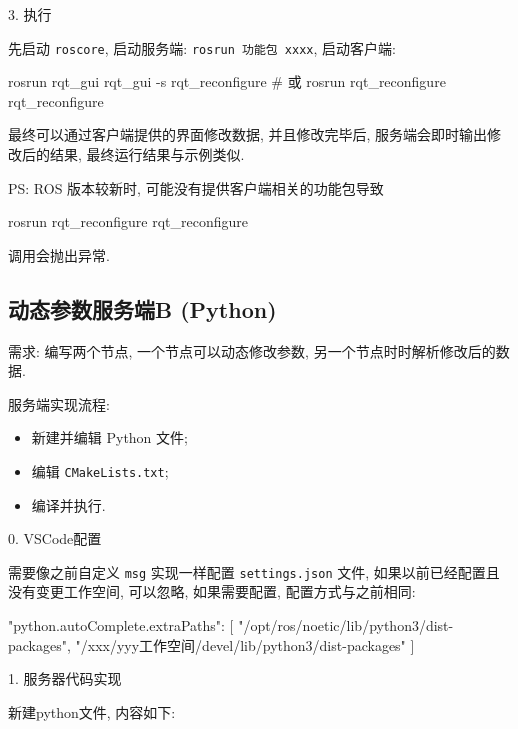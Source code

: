 \documentclass[openany, fontset=windowsold]{ctexbook}
\theoremstyle{kaiti}
\theoremstyle{normal}
\begin{document}
3. 执行

先启动 \verb|roscore|, 启动服务端: \verb|rosrun 功能包 xxxx|, 启动客户端:

\begin{bash}
  rosrun rqt_gui rqt_gui -s rqt_reconfigure # 或
  rosrun rqt_reconfigure rqt_reconfigure
\end{bash}

最终可以通过客户端提供的界面修改数据, 并且修改完毕后, 服务端会即时输出修改后的结果, 最终运行结果与示例类似.

PS: ROS 版本较新时, 可能没有提供客户端相关的功能包导致

\begin{bash}
  rosrun rqt_reconfigure rqt_reconfigure
\end{bash}

调用会抛出异常.

\subsection{动态参数服务端B (Python)}

需求: 编写两个节点, 一个节点可以动态修改参数, 另一个节点时时解析修改后的数据.

服务端实现流程:

\begin{itemize}
  \item 新建并编辑 Python 文件;
  \item 编辑 \verb|CMakeLists.txt|;
  \item 编译并执行.
\end{itemize}

0. VSCode配置

需要像之前自定义 \verb|msg| 实现一样配置 \verb|settings.json| 文件, 如果以前已经配置且没有变更工作空间, 可以忽略, 如果需要配置, 配置方式与之前相同:

\begin{bash}
  {
      "python.autoComplete.extraPaths": [
          "/opt/ros/noetic/lib/python3/dist-packages",
          "/xxx/yyy工作空间/devel/lib/python3/dist-packages"
      ]
  }
\end{bash}

1. 服务器代码实现

新建python文件, 内容如下:
\end{document}
